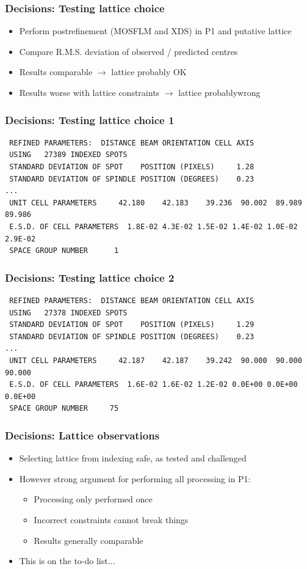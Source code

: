 \documentclass[slides,compress]{beamer}
\begin{document}
\begin{frame}
\frametitle{Decisions: Testing lattice choice}
\begin{itemize}
\item{Perform postrefinement (MOSFLM and XDS) in P1 and putative lattice}
\item{Compare R.M.S. deviation of observed / predicted centres}
\item{Results comparable $\rightarrow$ lattice probably OK}
\item{Results worse with lattice constraints $\rightarrow$ lattice probablywrong}
\end{itemize}
\end{frame}

\begin{frame}[fragile]
\frametitle{Decisions: Testing lattice choice 1}
{\small
\begin{verbatim}
 REFINED PARAMETERS:  DISTANCE BEAM ORIENTATION CELL AXIS                   
 USING   27389 INDEXED SPOTS
 STANDARD DEVIATION OF SPOT    POSITION (PIXELS)     1.28
 STANDARD DEVIATION OF SPINDLE POSITION (DEGREES)    0.23
...
 UNIT CELL PARAMETERS     42.180    42.183    39.236  90.002  89.989  89.986
 E.S.D. OF CELL PARAMETERS  1.8E-02 4.3E-02 1.5E-02 1.4E-02 1.0E-02 2.9E-02
 SPACE GROUP NUMBER      1
\end{verbatim}
}
\end{frame}

\begin{frame}[fragile]
\frametitle{Decisions: Testing lattice choice 2}
{\small
\begin{verbatim}
 REFINED PARAMETERS:  DISTANCE BEAM ORIENTATION CELL AXIS                   
 USING   27378 INDEXED SPOTS
 STANDARD DEVIATION OF SPOT    POSITION (PIXELS)     1.29
 STANDARD DEVIATION OF SPINDLE POSITION (DEGREES)    0.23
...
 UNIT CELL PARAMETERS     42.187    42.187    39.242  90.000  90.000  90.000
 E.S.D. OF CELL PARAMETERS  1.6E-02 1.6E-02 1.2E-02 0.0E+00 0.0E+00 0.0E+00
 SPACE GROUP NUMBER     75
\end{verbatim}
}
\end{frame}

\begin{frame}
\frametitle{Decisions: Lattice observations}
\begin{itemize}
\item{Selecting lattice from indexing safe, as tested and challenged}
\item{However strong argument for performing all processing in P1:
\begin{itemize}
\item{Processing only performed once}
\item{Incorrect constraints cannot break things}
\item{Results generally comparable}
\end{itemize}
}
\item{This is on the to-do list...}
\end{itemize}
\end{frame}
\end{document}
